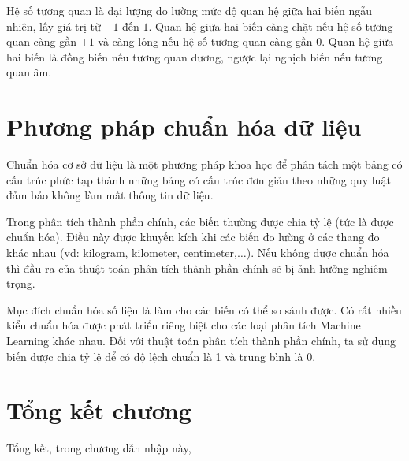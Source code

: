 \documentclass[../thesis.tex]{subfiles}
\begin{document}
Hệ số tương quan là đại lượng đo lường mức độ quan hệ giữa hai biến ngẫu nhiên, lấy giá trị từ $ -1 $ đến $ 1 $. Quan hệ giữa hai biến càng chặt nếu hệ số tương quan càng gần $ \pm1 $ và càng lỏng nếu hệ số tương quan càng gần $ 0 $. Quan hệ giữa hai biến là đồng biến nếu tương quan dương, ngược lại nghịch biến nếu tương quan âm.



\section{Phương pháp chuẩn hóa dữ liệu}

Chuẩn hóa cơ sở dữ liệu là một phương pháp khoa học để phân tách một bảng có cấu trúc phức tạp thành những bảng có cấu trúc đơn giản theo những quy luật đảm bảo không làm mất thông tin dữ liệu.

Trong phân tích thành phần chính, các biến thường được chia tỷ lệ (tức là được chuẩn hóa). Điều này được khuyến kích khi các biến đo lường ở các thang đo khác nhau (vd: kilogram, kilometer, centimeter,$ \ldots $). Nếu không được chuẩn hóa thì đầu ra của thuật toán phân tích thành phần chính sẽ bị ảnh hưởng nghiêm trọng.

Mục đích chuẩn hóa số liệu là làm cho các biến có thể so sánh được. Có rất nhiều kiểu chuẩn hóa được phát triển riêng biệt cho các loại phân tích Machine Learning  khác nhau. Đối với thuật toán phân tích thành phần chính, ta sử dụng biến được chia tỷ lệ để có độ lệch chuẩn là 1 và trung bình là 0.



\newpage
\section*{Tổng kết chương}

Tổng kết, trong chương dẫn nhập này, 
\end{document}
